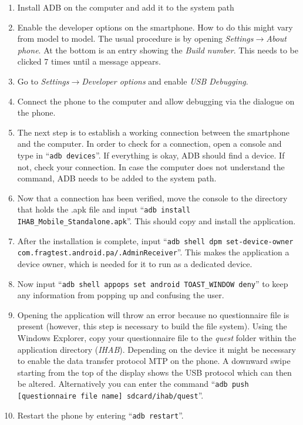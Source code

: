 \documentclass[11pt,a4paper,titlepage]{article}
\begin{document}
\begin{enumerate}

	\item Install ADB on the computer and add it to the system path
	\item Enable the developer options on the smartphone. How to do this might vary from model to model. The usual procedure is by opening \textit{Settings$\rightarrow$About phone}. At the bottom is an entry showing the \textit{Build number}. This needs to be clicked 7 times until a message appears.
	\item Go to \textit{Settings}$\rightarrow$\textit{Developer options} and enable \textit{USB Debugging}.
	\item Connect the phone to the computer and allow debugging via the dialogue on the phone.
	\item The next step is to establish a working connection between the smartphone and the computer. In order to check for a connection, open a console and type in ``\texttt{adb devices}''. If everything is okay, ADB should find a device. If not, check your connection. In case the computer does not understand the command, ADB needs to be added to the system path.
	\item Now that a connection has been verified, move the console to the directory that holds the .apk file and input ``\texttt{adb install IHAB\_Mobile\_Standalone.apk}''. This should copy and install the application. 
	\item After the installation is complete, input ``\texttt{adb shell dpm set-device-owner \newline com.fragtest.android.pa/.AdminReceiver}''. This makes the application a device owner, which is needed for it to run as a dedicated device.
	\item Now input ``\texttt{adb shell appops set android TOAST\_WINDOW deny}'' to keep any information from popping up and confusing the user.
	\item Opening the application will throw an error because no questionnaire file is present (however, this step is necessary to build the file system). Using the Windows Explorer, copy your questionnaire file to the \textit{quest} folder within the application directory (\textit{IHAB}). Depending on the device it might be necessary to enable the data transfer protocol MTP on the phone. A downward swipe starting from the top of the display shows the USB protocol which can then be altered. Alternatively you can enter the command ``\texttt{adb push [questionnaire file name] sdcard/ihab/quest}''.
	\item Restart the phone by entering ``\texttt{adb restart}''.
\end{enumerate}
\end{document}
